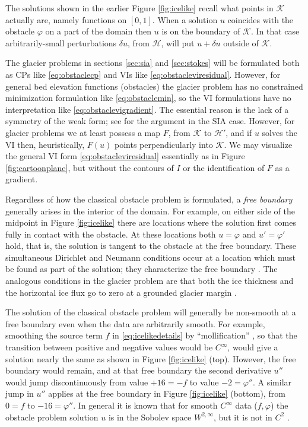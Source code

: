 \documentclass[letterpaper,final,12pt,reqno]{amsart}
\theoremstyle{claim}
\numberwithin{equation}{section}
\numberwithin{figure}{section}
\numberwithin{table}{section}
\numberwithin{theorem}{section}
\begin{document}
The solutions shown in the earlier Figure \ref{fig:icelike} recall what points in $\mathcal{K}$ actually are, namely functions on $[0,1]$.  When a solution $u$ coincides with the obstacle $\varphi$ on a part of the domain then $u$ is on the boundary of $\mathcal{K}$.  In that case arbitrarily-small perturbations $\delta u$, from $\mathcal{H}$, will put $u+\delta u$ outside of $\mathcal{K}$.

The glacier problems in sections \ref{sec:sia} and \ref{sec:stokes} will be formulated both as CPs like \eqref{eq:obstaclecp} and VIs like \eqref{eq:obstacleviresidual}.  However, for general bed elevation functions (obstacles) the glacier problem has no constrained minimization formulation like \eqref{eq:obstaclemin}, so the VI formulations have no interpretation like \eqref{eq:obstaclevigradient}.  The essential reason is the lack of a symmetry of the weak form; see \cite{JouvetBueler2012} for the argument in the SIA case.  However, for glacier problems we at least possess a map $F$, from $\mathcal{K}$ to $\mathcal{H}'$, and if $u$ solves the VI then, heuristically, $F(u)$ points perpendicularly into $\mathcal{K}$.  We may visualize the general VI form \eqref{eq:obstacleviresidual} essentially as in Figure \ref{fig:cartoonplane}, but without the contours of $I$ or the identification of $F$ as a gradient.

Regardless of how the classical obstacle problem is formulated, a \emph{free boundary} generally arises in the interior of the domain.  For example, on either side of the midpoint in Figure \ref{fig:icelike} there are locations where the solution first comes fully in contact with the obstacle.  At these locations both $u=\varphi$ and $u'=\varphi'$ hold, that is, the solution is tangent to the obstacle at the free boundary.  These simultaneous Dirichlet and Neumann conditions occur at a location which must be found as part of the solution; they characterize the free boundary \cite[Chapter V]{KinderlehrerStampacchia1980}.  The analogous conditions in the glacier problem are that both the ice thickness and the horizontal ice flux go to zero at a grounded glacier margin \cite{Bueler2016,JouvetBueler2012}.

The solution of the classical obstacle problem will generally be non-smooth at a free boundary even when the data are arbitrarily smooth.  For example, smoothing the source term $f$ in \eqref{eq:icelikedetails} by ``mollification'' \cite{Evans2010}, so that the transition between positive and negative values would be $C^\infty$, would give a solution nearly the same as shown in Figure \ref{fig:icelike} (top).  However, the free boundary would remain, and at that free boundary the second derivative $u''$ would jump discontinuously from value $+16=-f$ to value $-2=\varphi''$.  A similar jump in $u''$ applies at the free boundary in Figure \ref{fig:icelike} (bottom), from $0=f$ to $-16=\varphi''$.  In general it is known that for smooth $C^\infty$ data ($f,\varphi$) the obstacle problem solution $u$ is in the Sobolev space $W^{2,\infty}$, but it is not in $C^2$ \cite[section IV.6]{KinderlehrerStampacchia1980}.
\end{document}
